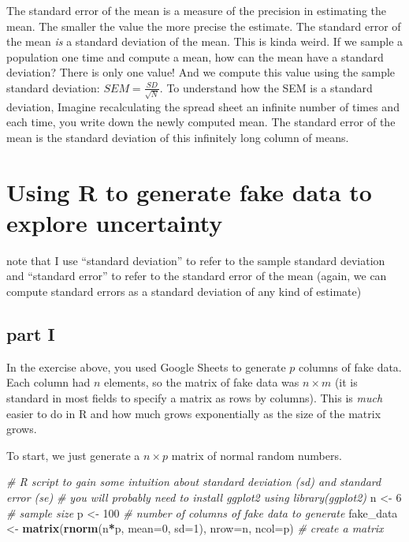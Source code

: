 \documentclass[]{book}
\newenvironment{Shaded}{\begin{snugshade}}{\end{snugshade}}
\newcommand{\KeywordTok}[1]{\textcolor[rgb]{0.13,0.29,0.53}{\textbf{#1}}}
\newcommand{\DataTypeTok}[1]{\textcolor[rgb]{0.13,0.29,0.53}{#1}}
\newcommand{\DecValTok}[1]{\textcolor[rgb]{0.00,0.00,0.81}{#1}}
\newcommand{\StringTok}[1]{\textcolor[rgb]{0.31,0.60,0.02}{#1}}
\newcommand{\CommentTok}[1]{\textcolor[rgb]{0.56,0.35,0.01}{\textit{#1}}}
\newcommand{\OperatorTok}[1]{\textcolor[rgb]{0.81,0.36,0.00}{\textbf{#1}}}
\newcommand{\NormalTok}[1]{#1}
\theoremstyle{definition}
\theoremstyle{definition}
\theoremstyle{definition}
\theoremstyle{remark}
\begin{document}
The standard error of the mean is a measure of the precision in
estimating the mean. The smaller the value the more precise the
estimate. The standard error of the mean \emph{is} a standard deviation
of the mean. This is kinda weird. If we sample a population one time and
compute a mean, how can the mean have a standard deviation? There is
only one value! And we compute this value using the sample standard
deviation: \(SEM = \frac{SD}{\sqrt{N}}\). To understand how the SEM is a
standard deviation, Imagine recalculating the spread sheet an infinite
number of times and each time, you write down the newly computed mean.
The standard error of the mean is the standard deviation of this
infinitely long column of means.

\section{Using R to generate fake data to explore
uncertainty}\label{using-r-to-generate-fake-data-to-explore-uncertainty}

note that I use ``standard deviation'' to refer to the sample standard
deviation and ``standard error'' to refer to the standard error of the
mean (again, we can compute standard errors as a standard deviation of
any kind of estimate)

\subsection{part I}\label{part-i}

In the exercise above, you used Google Sheets to generate \(p\) columns
of fake data. Each column had \(n\) elements, so the matrix of fake data
was \(n \times m\) (it is standard in most fields to specify a matrix as
rows by columns). This is \emph{much} easier to do in R and how much
grows exponentially as the size of the matrix grows.

To start, we just generate a \(n \times p\) matrix of normal random
numbers.

\begin{Shaded}
\begin{Highlighting}[]
\CommentTok{# R script to gain some intuition about standard deviation (sd) and standard error (se)}
\CommentTok{# you will probably need to install ggplot2 using library(ggplot2) }
\NormalTok{n <-}\StringTok{ }\DecValTok{6} \CommentTok{# sample size}
\NormalTok{p <-}\StringTok{ }\DecValTok{100} \CommentTok{# number of columns of fake data to generate}
\NormalTok{fake_data <-}\StringTok{ }\KeywordTok{matrix}\NormalTok{(}\KeywordTok{rnorm}\NormalTok{(n}\OperatorTok{*}\NormalTok{p, }\DataTypeTok{mean=}\DecValTok{0}\NormalTok{, }\DataTypeTok{sd=}\DecValTok{1}\NormalTok{), }\DataTypeTok{nrow=}\NormalTok{n, }\DataTypeTok{ncol=}\NormalTok{p) }\CommentTok{# create a matrix}
\end{Highlighting}
\end{Shaded}
\end{document}
